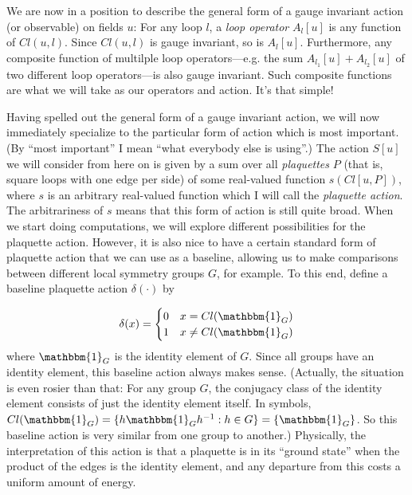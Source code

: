 \documentclass[9pt,twocolumn,twoside]{article}
\begin{document}
We are now in a position to describe the general form of a gauge invariant action (or observable) on fields $u$:  For any loop $l$, a \textit{loop operator} $A_l[u]$ is any function of $Cl(u,l)$.  Since $Cl(u,l)$ is gauge invariant, so is $A_l[u]$.  Furthermore, any composite function of multilple loop operators---e.g. the sum $A_{l_1}[u] + A_{l_2}[u]$ of two different loop operators---is also gauge invariant.  Such composite functions are what we will take as our operators and action.  It's that simple!

Having spelled out the general form of a gauge invariant action, we will now immediately specialize to the particular form of action which is most important.  (By ``most important'' I mean ``what everybody else is using''.)  The action $S[u]$ we will consider from here on is given by a sum over all \textit{plaquettes} $P$ (that is, square loops with one edge per side) of some real-valued function $s(Cl[u,P])$, where $s$ is an arbitrary real-valued function which I will call the \textit{plaquette action}.  The arbitrariness of $s$ means that this form of action is still quite broad.  When we start doing computations, we will explore different possibilities for the plaquette action.  However, it is also nice to have a certain standard form of plaquette action that we can use as a baseline, allowing us to make comparisons between different local symmetry groups $G$, for example.  To this end, define a baseline plaquette action $\delta(\cdot)$ by 

\begin{equation}
\delta(x) = 
\begin{cases}
0 & x = Cl(\mathbbm{1}_G) \\
1 & x \neq Cl(\mathbbm{1}_G) \\
\end{cases}
\end{equation}
where $\mathbbm{1}_G$ is the identity element of $G$.  Since all groups have an identity element, this baseline action always makes sense.  (Actually, the situation is even rosier than that: For any group $G$, the conjugacy class of the identity element consists of just the identity element itself.  In symbols, $Cl(\mathbbm{1}_G) = \{h\mathbbm{1}_G h^{-1} : h\in G\} = \{\mathbbm{1}_G\}$.  So this baseline action is very similar from one group to another.)  Physically, the interpretation of this action is that a plaquette is in its ``ground state'' when the product of the edges is the identity element, and any departure from this costs a uniform amount of energy.
\end{document}
